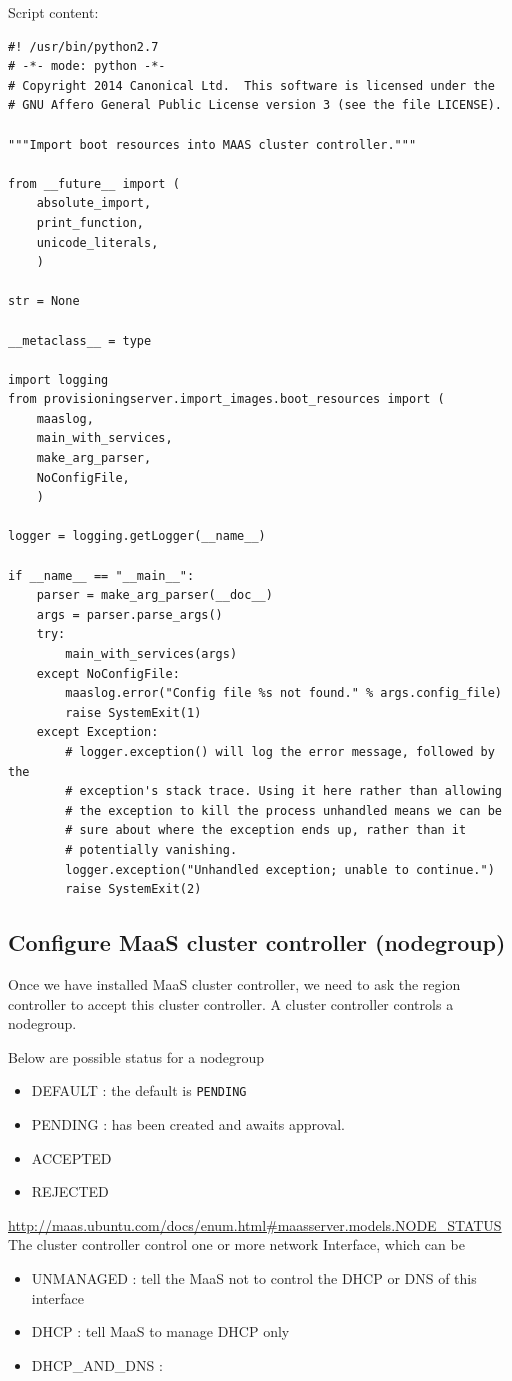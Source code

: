 Script content:
\begin{verbatim}
#! /usr/bin/python2.7
# -*- mode: python -*-
# Copyright 2014 Canonical Ltd.  This software is licensed under the
# GNU Affero General Public License version 3 (see the file LICENSE).

"""Import boot resources into MAAS cluster controller."""

from __future__ import (
    absolute_import,
    print_function,
    unicode_literals,
    )

str = None

__metaclass__ = type

import logging
from provisioningserver.import_images.boot_resources import (
    maaslog,
    main_with_services,
    make_arg_parser,
    NoConfigFile,
    )

logger = logging.getLogger(__name__)

if __name__ == "__main__":
    parser = make_arg_parser(__doc__)
    args = parser.parse_args()
    try:
        main_with_services(args)
    except NoConfigFile:
        maaslog.error("Config file %s not found." % args.config_file)
        raise SystemExit(1)
    except Exception:
        # logger.exception() will log the error message, followed by the
        # exception's stack trace. Using it here rather than allowing
        # the exception to kill the process unhandled means we can be
        # sure about where the exception ends up, rather than it
        # potentially vanishing.
        logger.exception("Unhandled exception; unable to continue.")
        raise SystemExit(2)
\end{verbatim}

\subsection{Configure MaaS cluster controller (nodegroup)}
\label{sec:configure_MaaS-cluster-controller}

Once we have installed MaaS cluster controller, we need to ask the region
controller to accept this cluster controller. A cluster controller controls a
nodegroup.

Below are possible status for a nodegroup
\begin{itemize}
  \item DEFAULT : the default is \verb!PENDING!
  \item PENDING : has been created and awaits approval.
  \item ACCEPTED
  \item REJECTED
\end{itemize}
\url{http://maas.ubuntu.com/docs/enum.html\#maasserver.models.NODE_STATUS}
The cluster controller control one or more network Interface, which can be 
\begin{itemize}
  \item UNMANAGED : tell the MaaS not to control the DHCP or DNS of this
  interface
  
  \item DHCP  : tell MaaS to manage DHCP only 
  \item DHCP\_AND\_DNS : 
\end{itemize}

